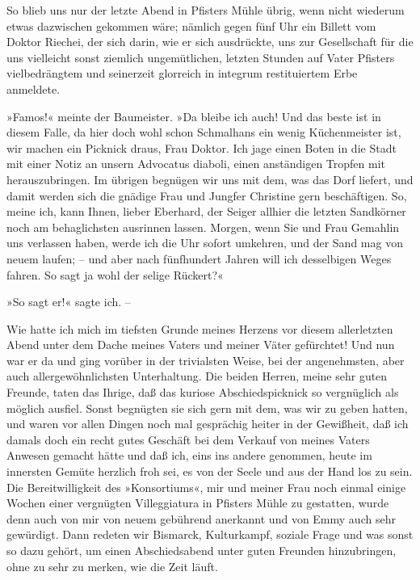 So blieb uns nur der letzte Abend in Pfisters Mühle übrig, wenn
nicht wiederum etwas dazwischen gekommen wäre; nämlich gegen fünf
Uhr ein Billett vom Doktor Riechei, der sich darin, wie er sich
ausdrückte, uns zur Gesellschaft für die uns vielleicht sonst
ziemlich ungemütlichen, letzten Stunden auf Vater Pfisters
vielbedrängtem und seinerzeit glorreich in integrum restituiertem
Erbe anmeldete.

»Famos!« meinte der Baumeister. »Da bleibe ich auch! Und das beste
ist in diesem Falle, da hier doch wohl schon Schmalhans ein wenig
Küchenmeister ist, wir machen ein Picknick draus, Frau Doktor. Ich
jage einen Boten in die Stadt mit einer Notiz an unsern Advocatus
diaboli, einen anständigen Tropfen mit herauszubringen. Im übrigen
begnügen wir uns mit dem, was das Dorf liefert, und damit werden
sich die gnädige Frau und Jungfer Christine gern beschäftigen. So,
meine ich, kann Ihnen, lieber Eberhard, der Seiger allhier die
letzten Sandkörner noch am behaglichsten ausrinnen lassen. Morgen,
wenn Sie und Frau Gemahlin uns verlassen haben, werde ich die Uhr
sofort umkehren, und der Sand mag von neuem laufen; – und aber nach
fünfhundert Jahren will ich desselbigen Weges fahren. So sagt ja
wohl der selige Rückert?«

»So sagt er!« sagte ich. –

Wie hatte ich mich im tiefsten Grunde meines Herzens vor diesem
allerletzten Abend unter dem Dache meines Vaters und meiner Väter
gefürchtet! Und nun war er da und ging vorüber in der trivialsten
Weise, bei der angenehmsten, aber auch allergewöhnlichsten
Unterhaltung. Die beiden Herren, meine sehr guten Freunde, taten
das Ihrige, daß das kuriose Abschiedspicknick so vergnüglich als
möglich ausfiel. Sonst begnügten sie sich gern mit dem, was wir zu
geben hatten, und waren vor allen Dingen noch mal gesprächig heiter
in der Gewißheit, daß ich damals doch ein recht gutes Geschäft bei
dem Verkauf von meines Vaters Anwesen gemacht hätte und daß ich,
eins ins andere genommen, heute im innersten Gemüte herzlich froh
sei, es von der Seele und aus der Hand los zu sein. Die
Bereitwilligkeit des »Konsortiums«, mir und meiner Frau noch einmal
einige Wochen einer vergnügten Villeggiatura in Pfisters Mühle zu
gestatten, wurde denn auch von mir von neuem gebührend anerkannt
und von Emmy auch sehr gewürdigt. Dann redeten wir Bismarck,
Kulturkampf, soziale Frage und was sonst so dazu gehört, um einen
Abschiedsabend unter guten Freunden hinzubringen, ohne zu sehr zu
merken, wie die Zeit läuft.


